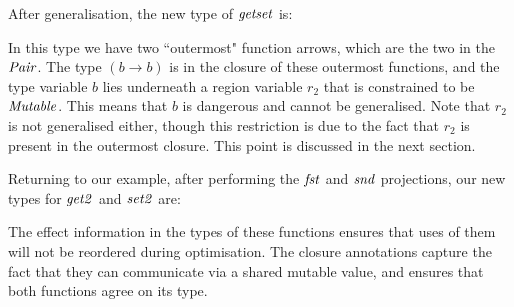 After generalisation, the new type of $\operatorname{\mathit{getset}}$ is:


In this type we have two ``outermost" function arrows, which are the two in the $\operatorname{\mathit{Pair}}$. The type $(b \to b)$ is in the closure of these outermost functions, and the type variable $b$ lies underneath a region variable $r_2$ that is constrained to be $\operatorname{\mathit{Mutable}}$. This means that $b$ is dangerous and cannot be generalised. Note that $r_2$ is not generalised either, though this restriction is due to the fact that $r_2$ is present in the outermost closure. This point is discussed in the next section.

Returning to our example, after performing the $\operatorname{\mathit{fst}}$ and $\operatorname{\mathit{snd}}$ projections, our new types for $\operatorname{\mathit{get2}}$ and $\operatorname{\mathit{set2}}$ are:


The effect information in the types of these functions ensures that uses of them will not be reordered during optimisation. The closure annotations capture the fact that they can communicate via a shared mutable value, and ensures that both functions agree on its type.


